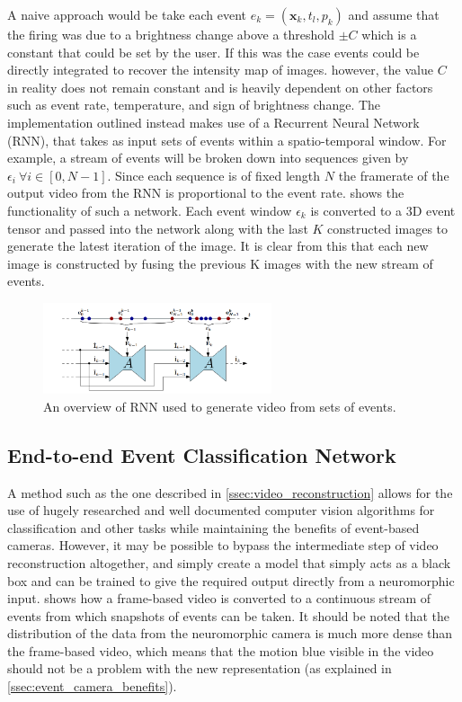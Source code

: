 A naive approach would be take each event $ e_k = (\boldsymbol{\mathbf{x}}_k, t_l, p_k ) $ and assume that the firing was due to a brightness change above a threshold $ \pm C $ which is a constant that could be set by the user. If this was the case events could be directly integrated to recover the intensity map of images. however, the value $ C $ in reality does not remain constant and is heavily dependent on other factors such as event rate, temperature, and sign of brightness change. The implementation outlined instead makes use of a Recurrent Neural Network (RNN), that takes as input sets of events within a spatio-temporal window. For example, a stream of events will be broken down into sequences given by $ \epsilon_i \: \forall i \in [0, N-1] $. Since each sequence is of fixed length $ N $ the framerate of the output video from the RNN is proportional to the event rate.  shows the functionality of such a network. Each event window $ \epsilon_k $ is converted to a 3D event tensor and passed into the network along with the last $ K $ constructed images to generate the latest iteration of the image. It is clear from this that each new image is constructed by fusing the previous K images with the new stream of events.

\begin{figure}[htb]
      \centering
      \includegraphics[width=0.6\textwidth]{background/images/spikes_to_video_rnn.png}
      \caption{An overview of RNN used to generate video from sets of events\cite{spikingToVideo}.}
      \label{fig:spikes_to_video_rnn}
\end{figure}

\subsection{End-to-end Event Classification Network}

A method such as the one described in \cref{ssec:video_reconstruction} allows for the use of hugely researched and well documented computer vision algorithms for classification and other tasks while maintaining the benefits of event-based cameras. However, it may be possible to bypass the intermediate step of video reconstruction altogether, and simply create a model that simply acts as a black box and can be trained to give the required output directly from a neuromorphic input.  shows how a frame-based video is converted to a continuous stream of events from which snapshots of events can be taken. It should be noted that the distribution of the data from the neuromorphic camera is much more dense than the frame-based video, which means that the motion blue visible in the video should not be a problem with the new representation (as explained in \cref{ssec:event_camera_benefits}).

